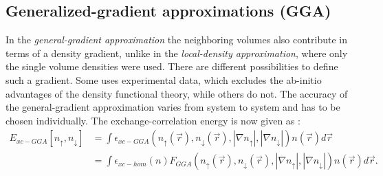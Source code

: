 		\subsection{Generalized-gradient approximations (GGA)}
			In the \textit{general-gradient approximation} the neighboring volumes also contribute in terms of a density gradient, unlike in the \textit{local-density approximation}, where only the single volume densities were used. There are different possibilities to define such a gradient. Some uses experimental data, which excludes the ab-initio advantages of the density functional theory, while others do not. The accuracy of the general-gradient approximation varies from system to system and has to be chosen individually. The exchange-correlation energy is now given as :
			\begin{equation}
				\begin{split}
					E_{xc-GGA}[n_\uparrow, n_\downarrow] &= \int \epsilon_{xc-GGA} (n_\uparrow(\vec r), n_\downarrow(\vec r), |\nabla n_\uparrow|, |\nabla n_\downarrow|)n(\vec r)d\vec r \\
					&= \int \epsilon_{xc-hom}(n)F_{GGA} (n_\uparrow(\vec r), n_\downarrow(\vec r), |\nabla n_\uparrow|, | \nabla n_\downarrow|) n(\vec r) d \vec r.
				\end{split}
			\end{equation}
	
